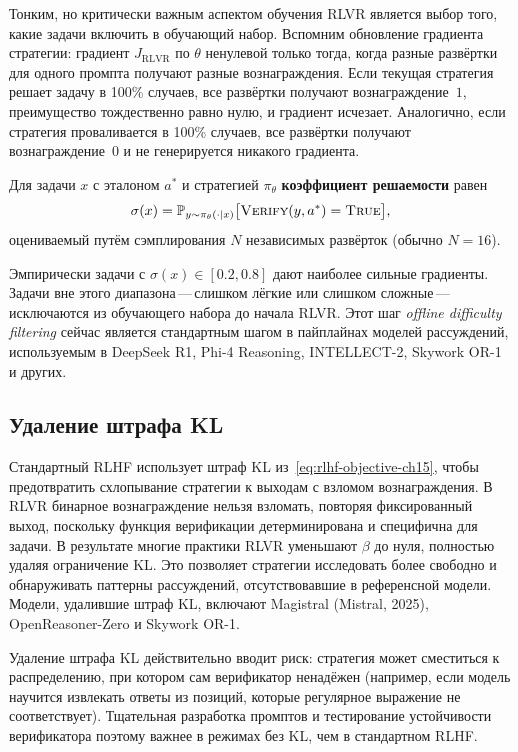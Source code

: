 Тонким, но критически важным аспектом обучения RLVR является выбор того, какие
задачи включить в обучающий набор. Вспомним обновление градиента стратегии:
градиент $J_{\mathrm{RLVR}}$ по $\theta$
ненулевой только тогда, когда разные развёртки для одного промпта получают
разные вознаграждения. Если текущая стратегия решает задачу в 100\% случаев,
все развёртки получают вознаграждение~$1$, преимущество тождественно
равно нулю, и градиент исчезает. Аналогично, если стратегия проваливается в 100\%
случаев, все развёртки получают вознаграждение~$0$ и не генерируется никакого градиента.

\begin{definition}
\label{def:solvability}
Для задачи $x$ с эталоном $a^*$ и стратегией $\pi_\theta$
\textbf{коэффициент решаемости} равен
\[
\sigma(x) = \mathbb{P}_{y \sim \pi_\theta(\cdot|x)}
            \bigl[\textsc{Verify}(y, a^*) = \textsc{True}\bigr],
\]
оцениваемый путём сэмплирования $N$ независимых развёрток (обычно $N = 16$).
\end{definition}

Эмпирически задачи с $\sigma(x) \in [0.2, 0.8]$ дают
наиболее сильные градиенты. Задачи вне этого диапазона\,---\,слишком лёгкие или
слишком сложные\,---\,исключаются из обучающего набора до начала RLVR.
Этот шаг \emph{offline difficulty filtering} сейчас является стандартным
шагом в пайплайнах моделей рассуждений, используемым в DeepSeek R1, Phi-4
Reasoning, INTELLECT-2, Skywork OR-1 и других.

\subsection{Удаление штрафа KL}
\label{subsec:no-kl}

Стандартный RLHF использует штраф KL из~\eqref{eq:rlhf-objective-ch15}, чтобы
предотвратить схлопывание стратегии к выходам с взломом вознаграждения. В
RLVR бинарное вознаграждение нельзя взломать, повторяя фиксированный выход,
поскольку функция верификации детерминирована и специфична для задачи.
В результате многие практики RLVR уменьшают $\beta$ до нуля, полностью удаляя
ограничение KL. Это позволяет стратегии исследовать более свободно
и обнаруживать паттерны рассуждений, отсутствовавшие в
референсной модели. Модели, удалившие штраф KL, включают
Magistral (Mistral, 2025), OpenReasoner-Zero и Skywork OR-1.

\begin{remark}
Удаление штрафа KL действительно вводит риск: стратегия может сместиться
к распределению, при котором сам верификатор ненадёжен (например,
если модель научится извлекать ответы из позиций, которые регулярное
выражение не соответствует). Тщательная разработка промптов и тестирование
устойчивости верификатора поэтому важнее в режимах без KL, чем в
стандартном RLHF.
\end{remark}

